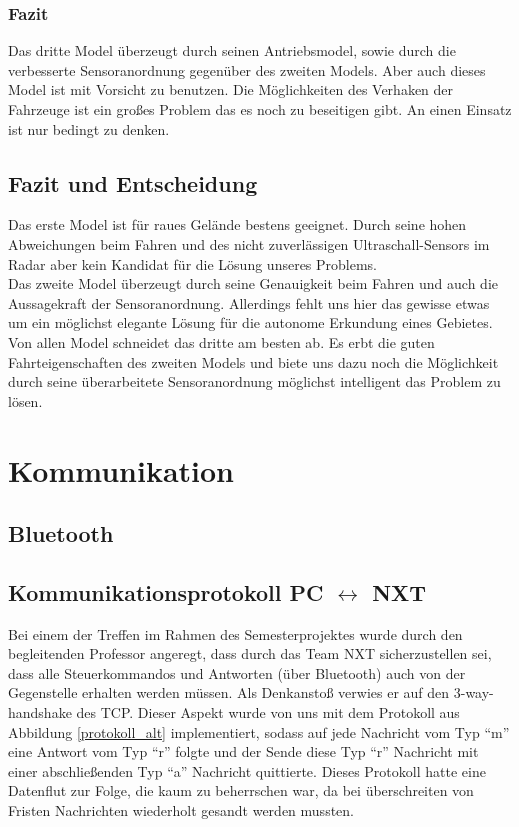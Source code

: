 \documentclass[10pt,a4paper]{scrartcl}
\begin{document}
\subsubsection{Fazit}
Das dritte Model überzeugt durch seinen Antriebsmodel, sowie durch die verbesserte Sensoranordnung gegenüber des zweiten Models. Aber auch dieses Model ist mit Vorsicht zu benutzen. Die Möglichkeiten des Verhaken der Fahrzeuge ist ein großes Problem das es noch zu beseitigen gibt. An einen Einsatz ist nur bedingt zu denken.
\subsection{Fazit und Entscheidung}
Das erste Model ist für raues Gelände bestens geeignet. Durch seine hohen Abweichungen beim Fahren und des nicht zuverlässigen Ultraschall-Sensors im Radar aber kein Kandidat für die Lösung unseres Problems.\\
Das zweite Model überzeugt durch seine Genauigkeit beim Fahren und auch die Aussagekraft der Sensoranordnung. Allerdings fehlt uns hier das gewisse etwas um ein möglichst elegante Lösung für die autonome Erkundung eines Gebietes.\\
Von allen Model schneidet das dritte am besten ab. Es erbt die guten Fahrteigenschaften des zweiten Models und biete uns dazu noch die Möglichkeit durch seine überarbeitete Sensoranordnung möglichst intelligent das Problem zu lösen. 
\section{Kommunikation}
\subsection{Bluetooth}
\subsection{Kommunikationsprotokoll PC $\leftrightarrow$ NXT}
Bei einem der Treffen im Rahmen des Semesterprojektes wurde durch den begleitenden Professor  angeregt, dass durch das Team NXT sicherzustellen sei, dass alle Steuerkommandos und Antworten (über Bluetooth) auch von der Gegenstelle erhalten werden müssen. Als Denkanstoß verwies er auf den 3-way-handshake des TCP. Dieser Aspekt wurde von uns mit dem Protokoll aus Abbildung \ref{protokoll_alt} implementiert, sodass auf jede Nachricht vom Typ "`m"' eine Antwort vom Typ "`r"' folgte und der Sende diese Typ "`r"' Nachricht mit einer abschließenden Typ "`a"' Nachricht quittierte. Dieses Protokoll hatte eine Datenflut zur Folge, die kaum zu beherrschen war, da bei überschreiten von Fristen Nachrichten wiederholt gesandt werden mussten. 
\end{document}
